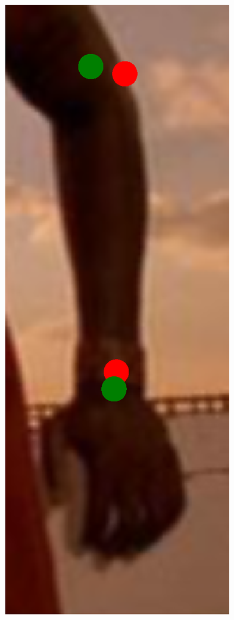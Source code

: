 \begin{figure}[!t]
    \includegraphics[height=\fh]{resources/Fixing/fix_3}
    \hfill

\end{figure}
